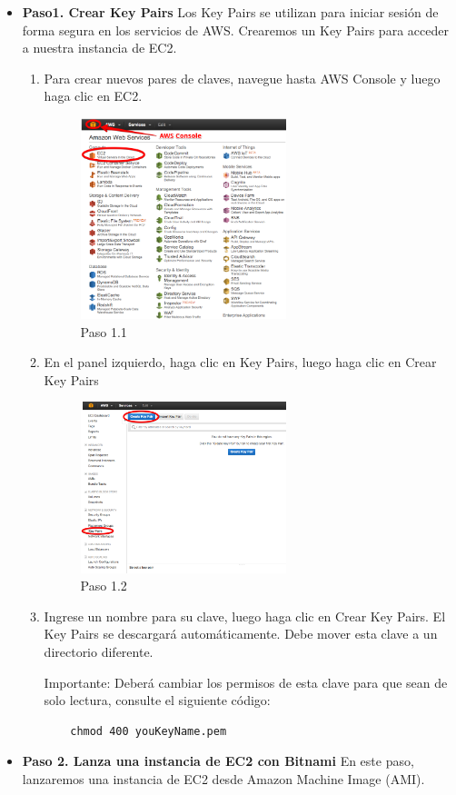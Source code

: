 \begin{itemize}
    \item \textbf{Paso1. Crear Key Pairs} Los Key Pairs se utilizan para iniciar sesión de forma segura en los servicios de AWS. Crearemos un Key Pairs para acceder a nuestra instancia de EC2.
\begin{enumerate}
    \item Para crear nuevos pares de claves, navegue hasta AWS Console y luego haga clic en EC2.
    \begin{figure}[H]
    \centering
    \includegraphics[width=60mm]{memoria/LaTeX/img/despliegue/paso1_1.png}
    \caption{Paso 1.1}
    \end{figure}
    \item En el panel izquierdo, haga clic en Key Pairs, luego haga clic en Crear Key Pairs
     \begin{figure}[H]
    \centering
    \includegraphics[width=60mm]{memoria/LaTeX/img/despliegue/paso1_2.png}
    \caption{Paso 1.2}
    \end{figure}
    \item Ingrese un nombre para su clave, luego haga clic en Crear Key Pairs. El Key Pairs se descargará automáticamente. Debe mover esta clave a un directorio diferente.
    
    Importante: Deberá cambiar los permisos de esta clave para que sean de solo lectura, consulte el siguiente código:
    \begin{lstlisting}
    chmod 400 youKeyName.pem
    \end{lstlisting}
\end{enumerate}
    \item \textbf{Paso 2. Lanza una instancia de EC2 con Bitnami} En este paso, lanzaremos una instancia de EC2 desde Amazon Machine Image (AMI). 
    

\end{itemize}
